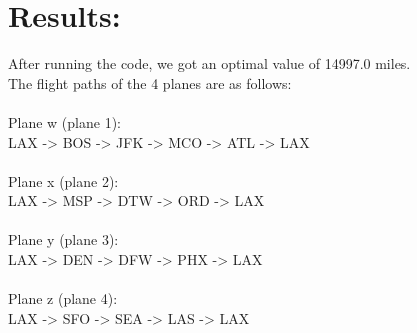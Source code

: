\documentclass[12pt]{extarticle}
\begin{document}
\section*{\small Results:}
After running the code, we got an optimal value of 14997.0 miles. \\
The flight paths of the 4 planes are as follows: \\ \\
Plane w (plane 1): \\
LAX -> BOS -> JFK -> MCO -> ATL -> LAX \\ \\
Plane x (plane 2): \\
LAX -> MSP -> DTW -> ORD -> LAX \\ \\
Plane y (plane 3): \\
LAX -> DEN -> DFW -> PHX -> LAX \\ \\
Plane z (plane 4): \\
LAX -> SFO -> SEA -> LAS -> LAX \\ \\
\end{document}
